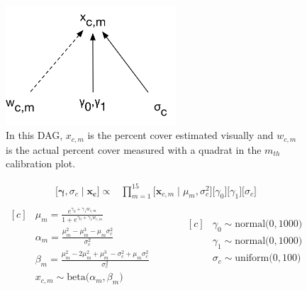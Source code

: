\documentclass[12pt, oneside]{article}
\newif\ifanswers
\begin{document}
\begin{enumerate}[leftmargin=*]
\ifanswers
\newpage
\begin{figure}[H]
\begin{center}
\includegraphics[width=2.5in]{WillowCalibrationDAG.png}
\caption{In this DAG, $x_{c,m}$ is the percent cover estimated visually and $w_{c,m}$ is the actual percent cover measured with a quadrat in the $m_{th}$ calibration plot.}
\end{center}
\end{figure}
\begin{align*}
\big[\bm{\gamma}, \sigma_{c} \mid \bm{x_{c}} \big] \varpropto & \prod_{m=1}^{15} \big[\bm{x}_{c,m} \mid \mu_{m}, \sigma^{2}_{c} \big]  \big[\gamma_{0} \big] \big[\gamma_{1} \big] \big[\sigma_{c} \big] \\
\end{align*}
\begin{equation*}
\begin{aligned}[c]
&\mu_{m}= \frac{e^{\gamma_{0} + \gamma_1 w_{c,m}}}{1 + e^{\gamma_{0} + \gamma_1 w_{c,m}}} \\
&\alpha_{m} =  \frac{\mu_{m}^{2} - \mu_{m}^{3} - \mu_{m}\sigma^{2}_{c}}{\sigma^{2}_{c}} \\
&\beta_{m} =  \frac{\mu_{m}^{2} - 2\mu_{m}^{2} + \mu_{m}^{3} - \sigma^{2}_{c} + \mu_{m}\sigma^{2}_{c}}{\sigma^{2}_{c}} \\
& x_{c,m} \sim \textrm{beta}\big(\alpha_{m}, \beta_{m}\big) \\
\end{aligned} \quad\quad\quad
\begin{aligned}[c]
&\gamma_{0} \sim \textrm{normal} \big(0, 1000) \\
&\gamma_{1} \sim \textrm{normal} \big(0, 1000) \\
&\sigma_{c} \sim \textrm{uniform} \big(0, 100) \\
& \\
& \\
\end{aligned}
\end{equation*}

\vspace{10 mm}


\end{enumerate}
\end{document}
